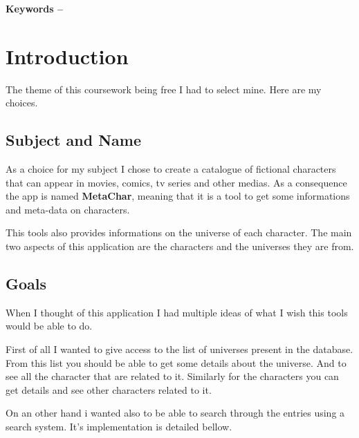 \documentclass[10pt, a4paper]{article}
\title{\mytitle}
\author{\myauthor\hspace{1em}\\\contact\\Edinburgh Napier University\hspace{0.5em}-\hspace{0.5em}\mymodule}
\date{}
\begin{document}
	\maketitle
	\begin{abstract}
		This is the my report for the first coursework of the Advanced Web Technologies module (code SET09103) at Edinburgh Napier University. \\
		This coursework consists in the creation of a basic web application to serve a catalogue of entries. This application should be developed using Python Flask.
	\end{abstract}
    
	\textbf{Keywords -- }{\mykeywords}
    
	\section{Introduction}
	The theme of this coursework being free I had to select mine. Here are my choices.
	
    \subsection{Subject and Name}
    As a choice for my subject I chose to create a catalogue of fictional characters that can appear in movies, comics, tv series and other medias. As a consequence the app is named \textbf{MetaChar}, meaning that it is a tool to get some informations and meta-data on characters.
    
    This tools also provides informations on the universe of each character. The main two aspects of this application are the characters and the universes they are from.
    
    \subsection{Goals}
    When I thought of this application I had multiple ideas of what I wish this tools would be able to do.
    
    First of all I wanted to give access to the list of universes present in the database. From this list you should be able to get some details about the universe. And to see all the character that are related to it. Similarly for the characters you can get details and see other characters related to it.
    
    On an other hand i wanted also to be able to search through the entries using a search system. It's implementation is detailed bellow.
    
\end{document}
